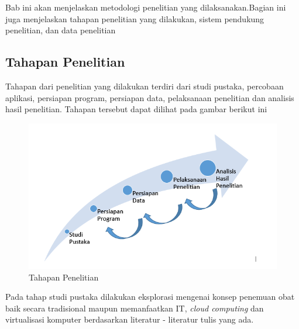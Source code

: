 \chapter{\babTiga}
Bab ini akan menjelaskan metodologi penelitian yang dilaksanakan.Bagian ini juga
menjelaskan tahapan penelitian yang dilakukan, sistem pendukung penelitian, dan data
penelitian

\section{Tahapan Penelitian}
\hspace{0.5cm}Tahapan dari penelitian yang dilakukan terdiri dari studi pustaka,
percobaan aplikasi, persiapan program, persiapan data, pelaksanaan penelitian dan analisis hasil
penelitian. Tahapan tersebut dapat dilihat pada gambar berikut ini
\begin{figure}
	\centering
	\includegraphics{workflow_skripsi.PNG}
	\caption{Tahapan Penelitian}
\end{figure}

Pada tahap studi pustaka dilakukan eksplorasi mengenai konsep penemuan obat baik secara tradisional maupun memanfaatkan IT, \textit{cloud computing} dan virtualisasi komputer berdasarkan literatur - literatur tulis yang ada. 

